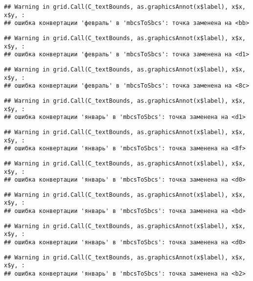 \documentclass[
]{article}
\begin{document}
\begin{verbatim}
## Warning in grid.Call(C_textBounds, as.graphicsAnnot(x$label), x$x, x$y, :
## ошибка конвертации 'февраль' в 'mbcsToSbcs': точка заменена на <bb>
\end{verbatim}

\begin{verbatim}
## Warning in grid.Call(C_textBounds, as.graphicsAnnot(x$label), x$x, x$y, :
## ошибка конвертации 'февраль' в 'mbcsToSbcs': точка заменена на <d1>
\end{verbatim}

\begin{verbatim}
## Warning in grid.Call(C_textBounds, as.graphicsAnnot(x$label), x$x, x$y, :
## ошибка конвертации 'февраль' в 'mbcsToSbcs': точка заменена на <8c>
\end{verbatim}

\begin{verbatim}
## Warning in grid.Call(C_textBounds, as.graphicsAnnot(x$label), x$x, x$y, :
## ошибка конвертации 'январь' в 'mbcsToSbcs': точка заменена на <d1>
\end{verbatim}

\begin{verbatim}
## Warning in grid.Call(C_textBounds, as.graphicsAnnot(x$label), x$x, x$y, :
## ошибка конвертации 'январь' в 'mbcsToSbcs': точка заменена на <8f>
\end{verbatim}

\begin{verbatim}
## Warning in grid.Call(C_textBounds, as.graphicsAnnot(x$label), x$x, x$y, :
## ошибка конвертации 'январь' в 'mbcsToSbcs': точка заменена на <d0>
\end{verbatim}

\begin{verbatim}
## Warning in grid.Call(C_textBounds, as.graphicsAnnot(x$label), x$x, x$y, :
## ошибка конвертации 'январь' в 'mbcsToSbcs': точка заменена на <bd>
\end{verbatim}

\begin{verbatim}
## Warning in grid.Call(C_textBounds, as.graphicsAnnot(x$label), x$x, x$y, :
## ошибка конвертации 'январь' в 'mbcsToSbcs': точка заменена на <d0>
\end{verbatim}

\begin{verbatim}
## Warning in grid.Call(C_textBounds, as.graphicsAnnot(x$label), x$x, x$y, :
## ошибка конвертации 'январь' в 'mbcsToSbcs': точка заменена на <b2>
\end{verbatim}
\end{document}
